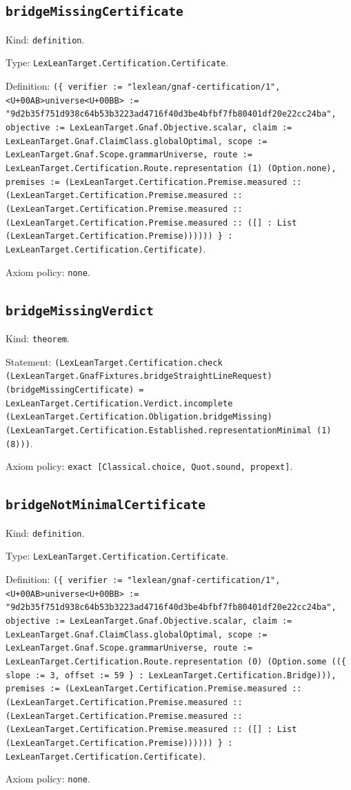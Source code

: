 \documentclass[11pt]{article}
\begin{document}
\subsection*{\texttt{bridgeMissingCertificate}}
\noindent Kind: \texttt{definition}.\par
\noindent Type: \texttt{LexLeanTarget.Certification.Certificate}.\par
\noindent Definition: \texttt{(\{ verifier := "lexlean/gnaf-certification/1", <U+00AB>universe<U+00BB> := "9d2b35f751d938c64b53b3223ad4716f40d3be4bfbf7fb80401df20e22cc24ba", objective := LexLeanTarget.Gnaf.Objective.scalar, claim := LexLeanTarget.Gnaf.ClaimClass.globalOptimal, scope := LexLeanTarget.Gnaf.Scope.grammarUniverse, route := LexLeanTarget.Certification.Route.representation (1) (Option.none), premises := (LexLeanTarget.Certification.Premise.measured :: (LexLeanTarget.Certification.Premise.measured :: (LexLeanTarget.Certification.Premise.measured :: (LexLeanTarget.Certification.Premise.measured :: ([] : List (LexLeanTarget.Certification.Premise)))))) \} : LexLeanTarget.Certification.Certificate)}.\par
\noindent Axiom policy: \texttt{none}.\par
\subsection*{\texttt{bridgeMissingVerdict}}
\noindent Kind: \texttt{theorem}.\par
\noindent Statement: \texttt{(LexLeanTarget.Certification.check (LexLeanTarget.GnafFixtures.bridgeStraightLineRequest) (bridgeMissingCertificate) = LexLeanTarget.Certification.Verdict.incomplete (LexLeanTarget.Certification.Obligation.bridgeMissing) (LexLeanTarget.Certification.Established.representationMinimal (1) (8)))}.\par
\noindent Axiom policy: \texttt{exact [Classical.choice, Quot.sound, propext]}.\par
\subsection*{\texttt{bridgeNotMinimalCertificate}}
\noindent Kind: \texttt{definition}.\par
\noindent Type: \texttt{LexLeanTarget.Certification.Certificate}.\par
\noindent Definition: \texttt{(\{ verifier := "lexlean/gnaf-certification/1", <U+00AB>universe<U+00BB> := "9d2b35f751d938c64b53b3223ad4716f40d3be4bfbf7fb80401df20e22cc24ba", objective := LexLeanTarget.Gnaf.Objective.scalar, claim := LexLeanTarget.Gnaf.ClaimClass.globalOptimal, scope := LexLeanTarget.Gnaf.Scope.grammarUniverse, route := LexLeanTarget.Certification.Route.representation (0) (Option.some ((\{ slope := 3, offset := 59 \} : LexLeanTarget.Certification.Bridge))), premises := (LexLeanTarget.Certification.Premise.measured :: (LexLeanTarget.Certification.Premise.measured :: (LexLeanTarget.Certification.Premise.measured :: (LexLeanTarget.Certification.Premise.measured :: ([] : List (LexLeanTarget.Certification.Premise)))))) \} : LexLeanTarget.Certification.Certificate)}.\par
\noindent Axiom policy: \texttt{none}.\par
\end{document}
